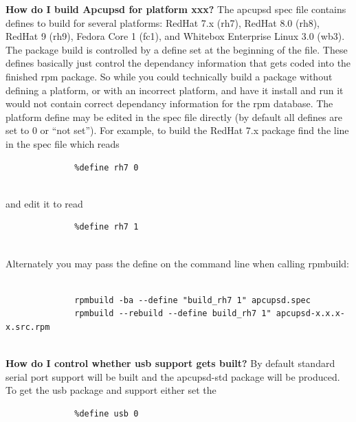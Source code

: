 \begin{description}

\item {\bf {\bf How do I build Apcupsd for platform xxx?}}
The apcupsd spec file contains defines to build for several platforms: RedHat
7.x (rh7), RedHat 8.0 (rh8), RedHat 9 (rh9), Fedora Core 1 (fc1), and Whitebox
Enterprise Linux 3.0 (wb3).  The package build is controlled by a define set
at the beginning of the file. These defines basically just control the
dependancy information that gets coded into the finished rpm package.  So
while you could technically build a package without defining a platform, or
with an incorrect platform, and have it install and run it would not contain
correct dependancy information for the rpm database.  The platform define may
be edited in the spec file directly (by default all defines are set to 0 or
``not set'').  For example, to build the RedHat 7.x package find the line in
the spec file which reads  

\footnotesize
\begin{verbatim}
              %define rh7 0
     
\end{verbatim}
\normalsize

and edit it to read  

\footnotesize
\begin{verbatim}
              %define rh7 1
     
\end{verbatim}
\normalsize

Alternately you may pass the define on the command line when calling rpmbuild:
 

\footnotesize
\begin{verbatim}
          
              rpmbuild -ba --define "build_rh7 1" apcupsd.spec
              rpmbuild --rebuild --define build_rh7 1" apcupsd-x.x.x-x.src.rpm
     
\end{verbatim}
\normalsize


\item {\bf {\bf How do I control whether usb support gets built?}}
By default standard serial port support will be built and the apcupsd-std
package will be produced. To get the usb package and support either set the  

\footnotesize
\begin{verbatim}
              %define usb 0
     

\end{verbatim}
\end{description}
